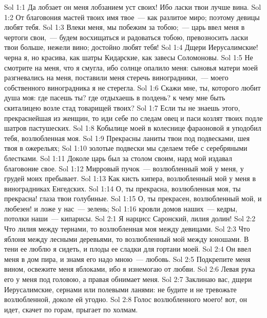 \vs Sol 1:1 Да лобзает он меня лобзанием уст своих! Ибо ласки твои лучше вина.
\vs Sol 1:2 От благовония мастей твоих имя твое~--- как разлитое миро; поэтому девицы любят тебя.
\vs Sol 1:3 Влеки меня, мы побежим за тобою;~--- царь ввел меня в чертоги свои,~--- будем восхищаться и радоваться тобою, превозносить ласки твои больше, нежели вино; достойно любят тебя!
\rsbpar\vs Sol 1:4 Дщери Иерусалимские! черна я, но красива, как шатры Кидарские, как завесы Соломоновы.
\vs Sol 1:5 Не смотрите на меня, что я смугла, ибо солнце опалило меня: сыновья матери моей разгневались на меня, поставили меня стеречь виноградники,~--- моего собственного виноградника я не стерегла.
\rsbpar\vs Sol 1:6 Скажи мне, ты, которого любит душа моя: где пасешь ты? где отдыхаешь в полдень? к чему мне быть скиталицею возле стад товарищей твоих?
\vs Sol 1:7 Если ты не знаешь этого, прекраснейшая из женщин, то иди себе по следам овец и паси козлят твоих подле шатров пастушеских.
\vs Sol 1:8 Кобылице моей в колеснице фараоновой я уподобил тебя, возлюбленная моя.
\vs Sol 1:9 Прекрасны ланиты твои под подвесками, шея твоя в ожерельях;
\vs Sol 1:10 золотые подвески мы сделаем тебе с серебряными блестками.
\vs Sol 1:11 Доколе царь был за столом своим, нард мой издавал благовоние свое.
\vs Sol 1:12 Мирровый пучок~--- возлюбленный мой у меня, у грудей моих пребывает.
\vs Sol 1:13 Как кисть кипера, возлюбленный мой у меня в виноградниках Енгедских.
\vs Sol 1:14 О, ты прекрасна, возлюбленная моя, ты прекрасна! глаза твои голубиные.
\vs Sol 1:15 О, ты прекрасен, возлюбленный мой, и любезен! и ложе у нас~--- зелень;
\vs Sol 1:16 кровли домов наших~--- кедры, потолки наши~--- кипарисы.
\vs Sol 2:1 Я нарцисс Саронский, лилия долин!
\vs Sol 2:2 Что лилия между тернами, то возлюбленная моя между девицами.
\vs Sol 2:3 Что яблоня между лесными деревьями, то возлюбленный мой между юношами. В тени ее люблю я сидеть, и плоды ее сладки для гортани моей.
\rsbpar\vs Sol 2:4 Он ввел меня в дом пира, и знамя его надо мною~--- любовь.
\vs Sol 2:5 Подкрепите меня вином, освежите меня яблоками, ибо я изнемогаю от любви.
\vs Sol 2:6 Левая рука его у меня под головою, а правая обнимает меня.
\vs Sol 2:7 Заклинаю вас, дщери Иерусалимские, сернами или полевыми ланями: не будите и не тревожьте возлюбленной, доколе ей угодно.
\rsbpar\vs Sol 2:8 Голос возлюбленного моего! вот, он идет, скачет по горам, прыгает по холмам.
